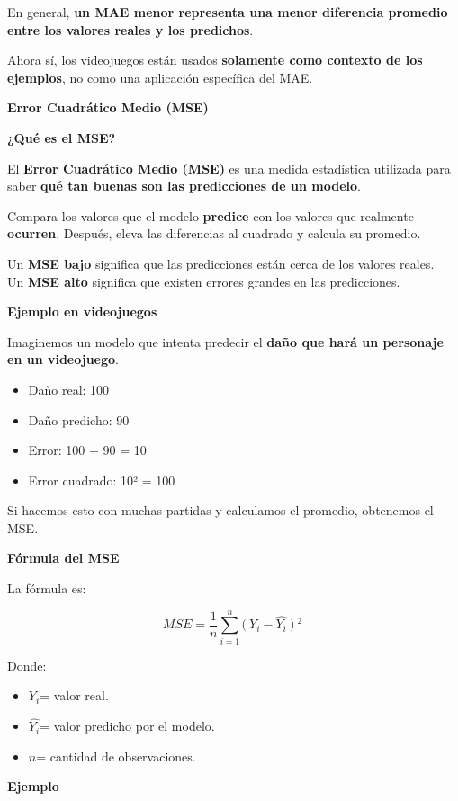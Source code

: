 \documentclass[]{article}
\begin{document}
En general, \textbf{un MAE menor representa una menor diferencia
promedio entre los valores reales y los predichos}.

Ahora sí, los videojuegos están usados \textbf{solamente como contexto
de los ejemplos}, no como una aplicación específica del MAE.

\textbf{Error Cuadrático Medio (MSE)}

\textbf{¿Qué es el MSE?}

El \textbf{Error Cuadrático Medio (MSE)} es una medida estadística
utilizada para saber \textbf{qué tan buenas son las predicciones de un
modelo}.

Compara los valores que el modelo \textbf{predice} con los valores que
realmente \textbf{ocurren}. Después, eleva las diferencias al cuadrado y
calcula su promedio.

Un \textbf{MSE bajo} significa que las predicciones están cerca de los
valores reales.\\
Un \textbf{MSE alto} significa que existen errores grandes en las
predicciones.

\textbf{Ejemplo en videojuegos}

Imaginemos un modelo que intenta predecir el \textbf{daño que hará un
personaje en un videojuego}.

\begin{itemize}
\item
  Daño real: 100
\item
  Daño predicho: 90
\item
  Error: 100 $-$ 90 = 10
\item
  Error cuadrado: 10² = 100
\end{itemize}

Si hacemos esto con muchas partidas y calculamos el promedio, obtenemos
el MSE.

\textbf{Fórmula del MSE}

La fórmula es:

\[MSE = \frac{1}{n}\sum_{i = 1}^{n}(\left. \ Y_{i} - \widehat{Y_{i}}\left. \ ) \right.\ ^{2} \right.\ \]

Donde:

\begin{itemize}
\item
  \(Y_{i}\)= valor real.
\item
  \(\widehat{Y_{i}}\)= valor predicho por el modelo.
\item
  \(n\)= cantidad de observaciones.
\end{itemize}

\textbf{Ejemplo}
\end{document}
